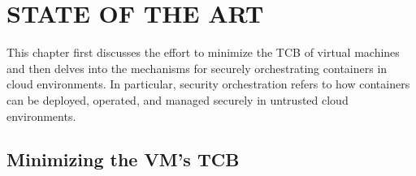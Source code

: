 \chapter{STATE OF THE ART}
\label{see:art}








This chapter first discusses the effort to minimize the \acrshort{TCB} of virtual machines and then delves into the mechanisms for securely orchestrating containers in cloud environments. In particular, security orchestration refers to how containers can be deployed, operated, and managed securely in untrusted cloud environments.


\section{Minimizing the VM's TCB}

